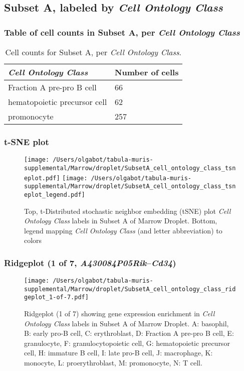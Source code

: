 \clearpage

\subsection{Subset A, labeled by \emph{Cell Ontology Class}}
\subsubsection{Table of cell counts in Subset A, per \emph{Cell Ontology Class}}\begin{table}[h]
\centering
\label{my-label}
\begin{tabular}{@{}ll@{}}
\toprule

\emph{Cell Ontology Class}& Number of cells \\ \midrule
Fraction A pre-pro B cell & 66 \\

hematopoietic precursor cell & 62 \\

promonocyte & 257 \\
\bottomrule
\end{tabular}
\caption{Cell counts for Subset A, per \emph{Cell Ontology Class}.}
\end{table}

\clearpage
\subsubsection{t-SNE plot}
\begin{figure}[h]
\centering
\texttt{[image: /Users/olgabot/tabula-muris-supplemental/Marrow/droplet/SubsetA\_cell\_ontology\_class\_tsneplot.pdf]}
\texttt{[image: /Users/olgabot/tabula-muris-supplemental/Marrow/droplet/SubsetA\_cell\_ontology\_class\_tsneplot\_legend.pdf]}
\caption{Top, t-Distributed stochastic neighbor embedding (tSNE) plot  \emph{Cell Ontology Class} labels in Subset A of Marrow Droplet. Bottom, legend mapping \emph{Cell Ontology Class} (and letter abbreviation) to colors}
\end{figure}


\clearpage

\subsubsection{Ridgeplot (1 of 7, \emph{A430084P05Rik}--\emph{Cd34})}
\begin{figure}[h]
\centering
\texttt{[image: /Users/olgabot/tabula-muris-supplemental/Marrow/droplet/SubsetA\_cell\_ontology\_class\_ridgeplot\_1-of-7.pdf]}

\caption{ Ridgeplot (1 of 7)  showing gene expression enrichment in \emph{Cell Ontology Class} labels in Subset A of Marrow Droplet. A: basophil, B: early pro-B cell, C: erythroblast, D: Fraction A pre-pro B cell, E: granulocyte, F: granulocytopoietic cell, G: hematopoietic precursor cell, H: immature B cell, I: late pro-B cell, J: macrophage, K: monocyte, L: proerythroblast, M: promonocyte, N: T cell.}
\end{figure}


